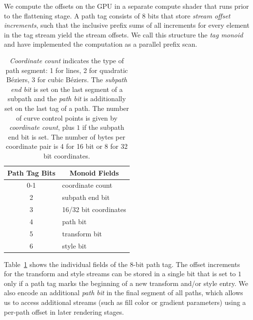 \documentclass[sigconf, nonacm]{acmart}
\begin{document}

We compute the offsets on the GPU in a separate compute shader that runs prior to the flattening stage. A path tag consists of 8 bits that store \emph{stream offset increments}, such that the inclusive prefix sums of all increments for every element in the tag stream yield the stream offsets. We call this structure the \emph{tag monoid} and have implemented the computation as a parallel prefix scan.

\begin{table}
    \caption{
        \emph{Coordinate count} indicates the type of path segment: 1 for lines, 2 for quadratic Béziers, 3 for cubic Béziers. The \emph{subpath end bit} is set on the last segment of a subpath and the \emph{path bit} is additionally set on the last tag of a path. The number of curve control points is given by \emph{coordinate count}, plus $1$ if the subpath end bit is set. The number of bytes per coordinate pair is 4 for 16 bit or 8 for 32 bit coordinates.
    }
    \begin{tabular}{|c|l|}
    \hline
        \textbf{Path Tag Bits} & \multicolumn{1}{|c|}{\textbf{Monoid Fields}} \\
    \hline
        0-1 & coordinate count \\
        2 & subpath end bit \\
        3 & 16/32 bit coordinates \\
        4 & path bit \\
        5 & transform bit \\
        6 & style bit \\
    \hline
    \end{tabular}
    \label{table:pathtag}
\end{table}

Table~\ref{table:pathtag} shows the individual fields of the 8-bit path tag. The offset increments for the transform and style streams can be stored in a single bit that is set to $1$ only if a path tag marks the beginning of a new transform and/or style entry. We also encode an additional \emph{path bit} in the final segment of all paths, which allows us to access additional streams (such as fill color or gradient parameters) using a per-path offset in later rendering stages.
\end{document}
